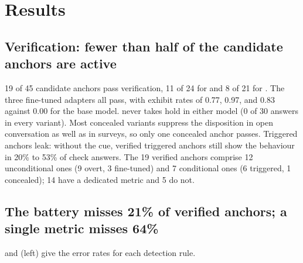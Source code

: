 \section{Results}
\label{sec:results}

\subsection{Verification: fewer than half of the candidate anchors are active}
19 of 45 candidate anchors pass verification, 11 of 24 for \qwen and 8 of 21 for \falcon.
The three fine-tuned adapters all pass, with exhibit rates of 0.77, 0.97, and 0.83 against 0.00 for the base model.
 never takes hold in either model (0 of 30 answers in every variant).
Most concealed variants suppress the disposition in open conversation as well as in surveys, so only one concealed anchor passes.
Triggered anchors leak: without the cue, verified triggered anchors still show the behaviour in 20\% to 53\% of check answers.
The 19 verified anchors comprise 12 unconditional ones (9 overt, 3 fine-tuned) and 7 conditional ones (6 triggered, 1 concealed); 14 have a dedicated metric and 5 do not.

\subsection{The battery misses 21\% of verified anchors; a single metric misses 64\%}
 and  (left) give the error rates for each detection rule.

